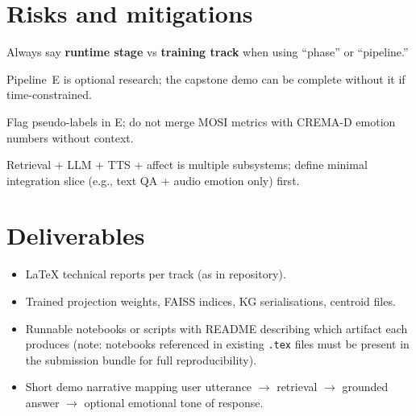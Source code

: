 \documentclass[12pt,a4paper]{article}
\begin{document}
\section{Risks and mitigations}

\begin{description}[style=nextline,font=\normalfont\bfseries]
  \item[Vocabulary collision.] Always say \textbf{runtime stage} vs
        \textbf{training track} when using ``phase'' or ``pipeline.''
  \item[Scope creep.] Pipeline~E is optional research; the capstone demo can be
        complete without it if time-constrained.
  \item[Label noise.] Flag pseudo-labels in E; do not merge MOSI metrics with CREMA-D
        emotion numbers without context.
  \item[Integration debt.] Retrieval + LLM + TTS + affect is multiple subsystems;
        define minimal integration slice (e.g., text QA + audio emotion only) first.
\end{description}

\section{Deliverables}

\begin{itemize}[nosep]
  \item LaTeX technical reports per track (as in repository).
  \item Trained projection weights, FAISS indices, KG serialisations, centroid files.
  \item Runnable notebooks or scripts with README describing which artifact each
        produces (note: notebooks referenced in existing \texttt{.tex} files must be
        present in the submission bundle for full reproducibility).
  \item Short demo narrative mapping user utterance $\rightarrow$ retrieval $\rightarrow$
        grounded answer $\rightarrow$ optional emotional tone of response.
\end{itemize}
\end{document}
